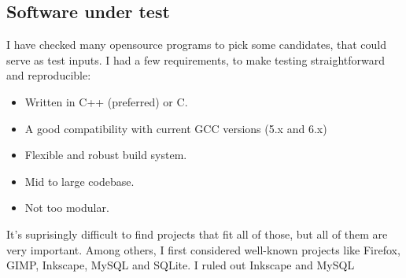 \subsection{Software under test}

I have checked many opensource programs to pick some candidates, that could
serve as test inputs. I had a few requirements, to make testing straightforward
and reproducible:

\begin{itemize}
	\item Written in C++ (preferred) or C.
	\item A good compatibility with current GCC versions (5.x and 6.x)
	\item Flexible and robust build system.
	\item Mid to large codebase.
	\item Not too modular.
\end{itemize}

It's suprisingly difficult to find projects that fit all of those, but all of
them are very important. Among others, I first considered well-known projects
like Firefox, GIMP, Inkscape, MySQL and SQLite. I ruled out Inkscape and MySQL
